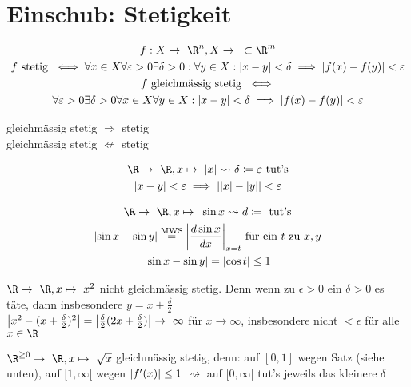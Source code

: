 \chapter{Einschub: Stetigkeit}
\begin{gather*}
	f: X \rightarrow \R^n , X \rightarrow \subset \R^m \\
	f \text{ stetig } \iff \forall x \in X \forall \epsilon > 0 \exists \delta > 0 : \forall y \in X : \abs{ x - y } < \delta \implies \abs{ f( x ) - f( y ) } < \epsilon \\
	f \text{ gleichmässig stetig } \iff \\
	\forall \epsilon > 0 \exists \delta > 0 \forall x \in X \forall y \in X : \abs{ x - y } < \delta \implies \abs{ f( x ) - f( y ) } < \epsilon 
\end{gather*}
\begin{bem}
	gleichmässig stetig $\Rightarrow$ stetig \\
	gleichmässig stetig $\not\Leftarrow$ stetig
\end{bem}
\begin{bsp*}
	\begin{gather*}
		\R \rightarrow \R , x \mapsto \abs{ x } \rightsquigarrow \delta \coloneqq \epsilon \text{ tut's} \\
		\abs{ x - y } < \epsilon \implies \abs{ \abs{ x } - \abs{ y } } < \epsilon
	\end{gather*}
\end{bsp*}
\begin{bsp*}
	\begin{gather*}
		\R \rightarrow \R , x \mapsto \sin x \rightsquigarrow d \coloneqq \text{ tut's} \\
		\abs{ \sin x - \sin y } \overset{\text{MWS}}{=} \abs{ \frac{d \sin x}{d x} }_{x = t} \text{ für ein $t$ zu $x,y$} \\
		\abs{ \sin x - \sin y } = \abs{ \cos t } \leq 1
	\end{gather*}
\end{bsp*}
\begin{bsp*}
	$\R \rightarrow \R , x \mapsto x^2$ nicht gleichmässig stetig. Denn wenn zu $\epsilon > 0$ ein $\delta > 0$ es täte, dann insbesondere $y = x + \frac{\delta}{2}$ \\
	$\abs{ x^2 - ( x + \frac{\delta}{2} )^2 } = \abs{ \frac{\delta}{2} (2x + \frac{\delta}{2} ) } \rightarrow \infty$ für $x \rightarrow \infty$, insbesondere nicht $< \epsilon$ für alle $x \in \R$
\end{bsp*}
\begin{bsp*}
	$\R^{\geq 0} \rightarrow \R , x \mapsto \sqrt{x}$ gleichmässig stetig, denn:
	auf $[0,1]$ wegen Satz (siehe unten), auf $[1,\infty[$ wegen $\abs{f'(x)} \leq 1$ $\rightsquigarrow$ auf $[0,\infty[$ tut's jeweils das kleinere $\delta$
\end{bsp*}
